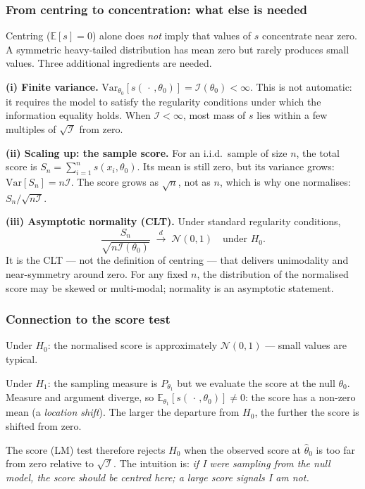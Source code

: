 \documentclass[a4paper,oneside,12pt]{extarticle}
\theoremstyle{plain}
\theoremstyle{definition}
\theoremstyle{remark}
\newcommand*{\E}{\mathbb{E}}
\newcommand*{\Var}{\mathrm{Var}}
\begin{document}
\subsubsection{From centring to concentration: what else is needed}

Centring ($\E[s]=0$) alone does \emph{not} imply that values of $s$
concentrate near zero.  A symmetric heavy-tailed distribution has
mean zero but rarely produces small values.  Three additional
ingredients are needed.

\textbf{(i) Finite variance.}
$\Var_{\theta_0}[s(\,\cdot\,,\theta_0)] = \mathcal{I}(\theta_0) <
\infty$.  This is not automatic: it requires the model to satisfy
the regularity conditions under which the information equality holds.
When $\mathcal{I}<\infty$, most mass of $s$ lies within a few
multiples of $\sqrt{\mathcal{I}}$ from zero.

\textbf{(ii) Scaling up: the sample score.}
For an i.i.d.\ sample of size $n$, the total score is
$S_n = \sum_{i=1}^n s(x_i,\theta_0)$.  Its mean is still zero, but
its variance grows: $\Var[S_n] = n\mathcal{I}$.  The score grows
as $\sqrt{n}$, not as $n$, which is why one normalises:
$S_n/\sqrt{n\mathcal{I}}$.

\textbf{(iii) Asymptotic normality (CLT).}
Under standard regularity conditions,
\[
  \frac{S_n}{\sqrt{n\mathcal{I}(\theta_0)}}
  \;\xrightarrow{d}\; \mathcal{N}(0,1)
  \quad \text{under } H_0.
\]
It is the CLT --- not the definition of centring --- that delivers
unimodality and near-symmetry around zero.  For any fixed $n$, the
distribution of the normalised score may be skewed or multi-modal;
normality is an asymptotic statement.

\subsubsection{Connection to the score test}

Under $H_0$: the normalised score is approximately $\mathcal{N}(0,1)$
--- small values are typical.

Under $H_1$: the sampling measure is $P_{\theta_1}$ but we evaluate
the score at the null $\theta_0$.  Measure and argument diverge, so
$\E_{\theta_1}[s(\,\cdot\,,\theta_0)] \neq 0$: the score has a
non-zero mean (a \emph{location shift}).  The larger the departure
from $H_0$, the further the score is shifted from zero.

The score (LM) test therefore rejects $H_0$ when the observed score
at $\hat\theta_0$ is too far from zero relative to $\sqrt{\mathcal{I}}$.
The intuition is: \emph{if I were sampling from the null model, the
score should be centred here; a large score signals I am not.}
\end{document}
